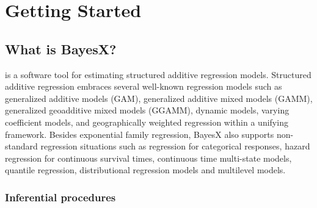 
\chapter{Getting Started}

\section{What is BayesX?}

\BayesX is a software tool for estimating structured additive regression models. Structured additive regression embraces several well-known regression models such as generalized additive models (GAM), generalized additive mixed models (GAMM), generalized geoadditive mixed models (GGAMM), dynamic models, varying coefficient models, and geographically weighted regression within a unifying framework. Besides exponential family regression, BayesX also supports non-standard regression situations such as regression for categorical responses, hazard regression for continuous survival times, continuous time multi-state models, quantile regression, distributional regression models and multilevel models.

\subsection{Inferential procedures}

